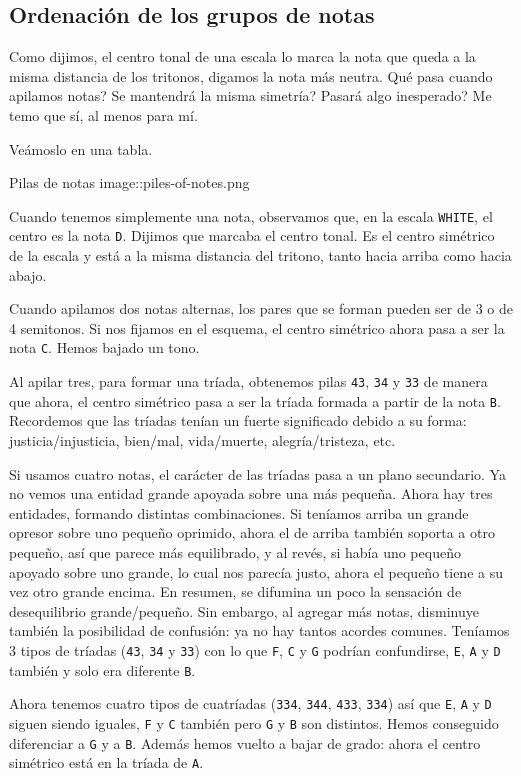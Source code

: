 \documentclass[]{article}
\begin{document}
\subsection{Ordenación de los grupos de notas}

Como dijimos, el centro tonal de una escala lo marca la nota que queda a la misma distancia de los tritonos, digamos la nota más neutra. Qué pasa cuando apilamos notas? Se mantendrá la misma simetría? Pasará algo inesperado? Me temo que sí, al menos para mí.

Veámoslo en una tabla.

 Pilas de notas image::piles-of-notes.png

Cuando tenemos simplemente una nota, observamos que, en la escala \texttt{WHITE}, el centro es la nota \texttt{D}. Dijimos que marcaba el centro tonal. Es el centro simétrico de la escala y está a la misma distancia del tritono, tanto hacia arriba como hacia abajo.

Cuando apilamos dos notas alternas, los pares que se forman pueden ser de 3 o de 4 semitonos. Si nos fijamos en el esquema, el centro simétrico ahora pasa a ser la nota \texttt{C}. Hemos bajado un tono.

Al apilar tres, para formar una tríada, obtenemos pilas \texttt{43}, \texttt{34} y \texttt{33} de manera que ahora, el centro simétrico pasa a ser la tríada formada a partir de la nota \texttt{B}. Recordemos que las tríadas tenían un fuerte significado debido a su forma: justicia/injusticia, bien/mal, vida/muerte, alegría/tristeza, etc.

Si usamos cuatro notas, el carácter de las tríadas pasa a un plano secundario. Ya no vemos una entidad grande apoyada sobre una más pequeña. Ahora hay tres entidades, formando distintas combinaciones. Si teníamos arriba un grande opresor sobre uno pequeño oprimido, ahora el de arriba también soporta a otro pequeño, así que parece más equilibrado, y al revés, si había uno pequeño apoyado sobre uno grande, lo cual nos parecía justo, ahora el pequeño tiene a su vez otro grande encima. En resumen, se difumina un poco la sensación de desequilibrio grande/pequeño. Sin embargo, al agregar más notas, disminuye también la posibilidad de confusión: ya no hay tantos acordes comunes. Teníamos 3 tipos de tríadas (\texttt{43}, \texttt{34} y \texttt{33}) con lo que \texttt{F}, \texttt{C} y \texttt{G} podrían confundirse, \texttt{E}, \texttt{A} y \texttt{D} también y solo era diferente \texttt{B}.

Ahora tenemos cuatro tipos de cuatríadas (\texttt{334}, \texttt{344}, \texttt{433}, \texttt{334}) así que \texttt{E}, \texttt{A} y \texttt{D} siguen siendo iguales, \texttt{F} y \texttt{C} también pero \texttt{G} y \texttt{B} son distintos. Hemos conseguido diferenciar a \texttt{G} y a \texttt{B}. Además hemos vuelto a bajar de grado: ahora el centro simétrico está en la tríada de \texttt{A}.
\end{document}

